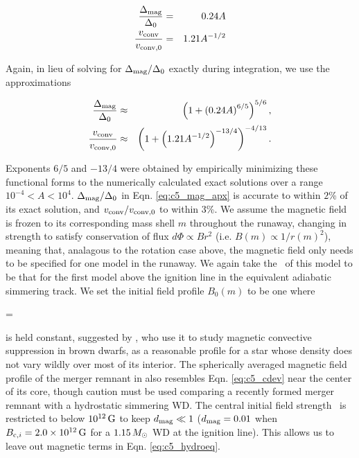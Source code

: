 
\begin{eqnarray}
\frac{\dnabmag}{\dnabconvzero} &=& 0.24A \nonumber \\
\frac{\vconv}{\vconvzero} &=& 1.21A^{-1/2}
\label{eq:c5_mag_exactsoln}
\end{eqnarray}

\noindent Again, in lieu of solving for $\dnabmag/\dnabconvzero$ exactly during integration, we use the approximations 

\begin{eqnarray}
\frac{\dnabmag}{\dnabconvzero} &\approx& \left(1 + \left(0.24A\right)^{6/5}\right)^{5/6}, \nonumber \\
\frac{\vconv}{\vconvzero} &\approx& \left(1 + \left(1.21A^{-1/2}\right)^{-13/4}\right)^{-4/13}.
\label{eq:c5_mag_apx}
\end{eqnarray}

\noindent Exponents $6/5$ and $-13/4$ were obtained by empirically minimizing these functional forms to the numerically calculated exact solutions over a range $10^{-4} < A < 10^4$.  $\dnabmag/\dnabconvzero$ in Eqn. \ref{eq:c5_mag_apx} is accurate to within $2$\% of its exact solution, and $\vconv/\vconvzero$ to within $3$\%.  We assume the magnetic field is frozen to its corresponding mass shell $m$ throughout the runaway, changing in strength to satisfy conservation of flux $d\Phi \propto B r^2$ (i.e. $B(m) \propto 1/r(m)^2$), meaning that, analagous to the rotation case above, the magnetic field only needs to be specified for one model in the runaway.  We again take the \Sc\ of this model to be that for the first model above the ignition line in the equivalent adiabatic simmering track.  We set the initial field profile $B_0(m)$ to be one where

\eqbegin
\dmag = 
\label{eq:c5_cdev}
\eqend


\noindent is held constant, suggested by \cite{macdm09}, who use it to study magnetic convective suppression in brown dwarfs, as a reasonable profile for a star whose density does not vary wildly over most of its interior.  The spherically averaged magnetic field profile of the merger remnant in \cite{zhu+15} also resembles Eqn. \ref{eq:c5_cdev} near the center of its core, though caution must be used comparing a recently formed merger remnant with a hydrostatic simmering WD.  The central initial field strength \Binit\ is restricted to below $10^{12}\,\mathrm{G}$ to keep $\dmag \ll 1$ ($\dmag = 0.01$ when $\Binit = 2.0\times10^{12}\,\mrm{G}$ for a $1.15\,\Msun$ WD at the ignition line).  This allows us to leave out magnetic terms in Eqn. \ref{eq:c5_hydroeq}.

